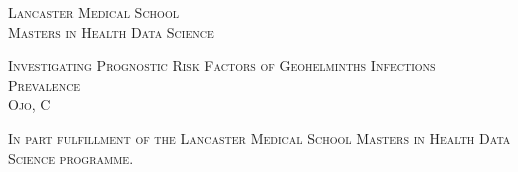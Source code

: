 
\begin{titlepage}

        \begin{center}

            \vspace*{1cm}

            \begin{minipage}{0.95\textwidth}

                \begin{center}
                    {\sffamily \small \textsc{Lancaster Medical School\\Masters in Health Data Science}}
                    \vspace{3.5cm}

                    {\sffamily \large \textsc{Investigating Prognostic Risk Factors of Geohelminths Infections Prevalence}\\
                    \small \textsc{Ojo, C}}
                    \vspace{9.5cm}

                    {\sffamily \small \textsc{In part fulfillment of the Lancaster Medical School Masters in Health Data Science programme.}}

                \end{center}

            \end{minipage}

        \end{center}

\end{titlepage}